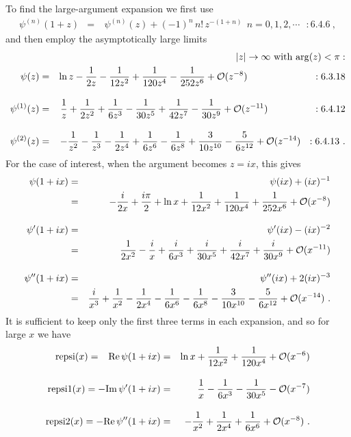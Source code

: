 \documentclass[preprint,12pt,eqsecnum,nofootinbib,amsmath,amssymb]{revtex4}
\begin{document}
To find the large-argument expansion we first use
\begin{eqnarray}
  \psi^{(n)}(1 + z) &=& \  \psi^{(n)}(z) + (-1)^n \, 
  n!\, z^{-(1+n)} ~~n=0,1,2,\cdots   ~~~: 6.4.6 ~ ,
\end{eqnarray}
and then employ the asymptotically large limits
\begin{eqnarray}
\nonumber
  && \hskip-1.5cm 
  \vert z \vert \to \infty ~{\rm with}~ {\rm arg}(z)<\pi :
\\
  \psi(z) &=& \ln z - \frac{1}{2z} - \frac{1}{12 z^2} +
  \frac{1}{120 z^4} - \frac{1}{252 z^6} + {\cal O}(z^{-8})
  \hskip2.4cm : 6.3.18
\\[10pt]
  \psi^{(1)}(z) &=& \frac{1}{z} + \frac{1}{2z^2} +
  \frac{1}{6 z^3} - \frac{1}{30 z^5} + \frac{1}{42 z^7}
  - \frac{1}{30 z^9} + {\cal O}(z^{-11})
  \hskip1.65cm :6.4.12
\\[10pt]
  \psi^{(2)}(z) &=& -\frac{1}{z^2} - \frac{1}{z^3} -
  \frac{1}{2 z^4} + \frac{1}{6 z^6} - \frac{1}{6 z^8}
  + \frac{3}{10 z^{10}} - \frac{5}{6 z^{12}} + {\cal O}(z^{-14})
  ~~ :6.4.13 ~ .
\end{eqnarray}
For the case of interest, when the argument becomes 
$z=i x$, this gives
\begin{eqnarray}
\nonumber
  \psi(1 + i x) &=& \psi(ix) + (ix)^{-1}
\\
\label{psitosix}
  &=&
   - \frac{i}{2 x} + \frac{i \pi}{2} + \ln x + 
  \frac{1}{12 x^2} + \frac{1}{120 x^4} + \frac{1}{252 x^6} 
  + {\cal O}(x^{-8})
\\[10pt]
\nonumber
  \psi^\prime(1 + i x) &=& \psi^\prime(i x) - (i x)^{-2}
\\
  &=&
  \frac{1}{2 x^2} -\frac{i}{x}  + \frac{i}{6 x^3} 
  + \frac{i}{30 x^5} + \frac{i}{42 x^7}
  + \frac{i}{30 x^9} + {\cal O}(x^{-11})
\\[10pt]
\nonumber
  \psi^{\prime\prime}(1 + i x) &=& \psi^{\prime\prime}(i x) 
  + 2(i x)^{-3}
\\
  &=&
  \frac{i}{x^3} + \frac{1}{x^2}  - \frac{1}{2 x^4} 
  - \frac{1}{6 x^6} - \frac{1}{6 x^8}
  - \frac{3}{10 x^{10}} - \frac{5}{6 x^{12}} + 
  {\cal O}(x^{-14}) \ .
\end{eqnarray}
It is sufficient to keep only the first three terms
in each expansion, and so for large $x$ we have
\begin{eqnarray}
  {\rm repsi}(x) = \phantom{-}
  {\rm Re}\,\psi(1 + i x) &=&
  \ln x + \frac{1}{12 x^2} + \frac{1}{120 x^4} + 
  {\cal O}(x^{-6})
\\[10pt]
  {\rm repsi1}(x) = 
  -{\rm Im}\,\psi^\prime(1 + i x) &=& 
  \frac{1}{x}  - \frac{1}{6 x^3} 
  - \frac{1}{30 x^5} - {\cal O}(x^{-7})
\\[10pt]
  {\rm repsi2}(x) = 
  -{\rm Re}\,\psi^{\prime\prime}(1 + i x) &=& 
  -\frac{1}{x^2}  + \frac{1}{2 x^4} 
  + \frac{1}{6 x^6} + {\cal O}(x^{-8}) \ .
\end{eqnarray}
\end{document}
